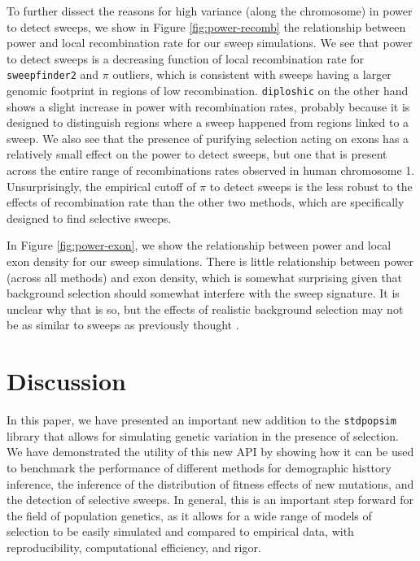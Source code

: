 \documentclass[hidelinks]{article}
\newcommand{\stdpopsim}{\texttt{stdpopsim}\xspace}
\newcommand{\sweepfinder}{\texttt{sweepfinder2}\xspace}
\newcommand{\diploshic}{\texttt{diploshic}\xspace}
\begin{document}
    To further dissect the reasons for high variance (along the chromosome) in power to detect sweeps,
    we show in Figure \ref{fig:power-recomb} the relationship between power and local recombination rate for our sweep simulations.
    We see that power to detect sweeps is
    a decreasing function of local recombination rate for \sweepfinder and $\pi$ outliers,
    which is consistent with sweeps having a larger genomic footprint in regions of low
    recombination.
    \diploshic on the other hand shows a slight increase in power with recombination rates,
    probably because it is designed to distinguish regions where a sweep happened from regions linked to a sweep.
    We also see that the presence of purifying selection acting on exons has a relatively small effect on the power to detect sweeps,    
    but one that is present across the entire range of recombinations rates observed in human chromosome 1. 
    Unsurprisingly, the empirical cutoff of $\pi$ to detect sweeps is the less robust to the effects of recombination rate than the other two methods,
    which are specifically designed to find selective sweeps. 

    In Figure \ref{fig:power-exon}, we show the relationship between power and local exon density for our sweep simulations.
    There is little relationship between power (across all methods) and exon density,
    which is somewhat surprising given that background selection should somewhat interfere with the sweep signature.
    It is unclear why that is so, but the effects of realistic background selection may not be as similar to sweeps as previously thought \citep{schrider2020background}.

\section*{Discussion}
    \label{Discussion}
    In this paper, we have presented an important new addition to the \stdpopsim{} library
    that allows for simulating genetic variation in the presence of selection.
    We have demonstrated the utility of this new API by showing how it can be used to benchmark
    the performance of different methods for demographic histtory inference, the inference of the distribution
    of fitness effects of new mutations, and the detection of selective sweeps.
    In general, this is an important step forward for the field of population genetics,
    as it allows for a wide range of models of selection to be easily simulated and compared to
    empirical data, with reproducibility, computational efficiency, and rigor.
\end{document}
